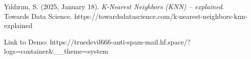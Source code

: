 \documentclass[conference]{IEEEtran}
\begin{document}
\begin{thebibliography}{00}
        Yıldırım, S. (2025, January 18). \textit{K-Nearest Neighbors (KNN) – explained}.
        Towards Data Science.
        https://towardsdatascience.com/k-nearest-neighbors-knn-explained\
    \end{thebibliography}

    \medskip
    Link to Demo:
    https://truedevil666-anti-spam-mail.hf.space/?logs=container\&\_\_theme=system
\end{document}
